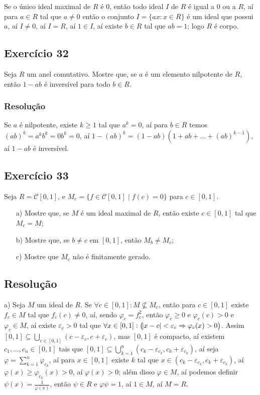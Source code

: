 \documentclass[10pt,a4paper]{article}
\begin{document}
\medskip
\noindent
Se o único ideal maximal de $R$ é $0$, então todo ideal $I$ de $R$ é igual a $0$ ou a $R$, aí para $a\in R$ tal que $a\neq 0$ então o conjunto $I=\{ax:x\in R\}$ é um ideal que possui $a$, aí $I\neq 0$, aí $I=R$, aí $1\in I$, aí existe $b\in R$ tal que $ab=1$; logo $R$ é corpo.

\subsection*{Exercício 32}
Seja $R$ um anel comutativo. Mostre que, se $a$ é um elemento nilpotente de $R$, então $1-ab$ é inversível para todo $b\in R$.

\subsubsection*{Resolução}

Se $a$ é nilpotente, existe $k\geq 1$ tal que $a^k=0$, aí para $b\in R$ temos $(ab)^k=a^kb^k=0b^k=0$, aí $1-(ab)^k=(1-ab)(1+ab+\dots+(ab)^{k-1})$, aí $1-ab$ é inversível.

\subsection*{Exercício 33}
Seja $R=\mathcal{C}[0,1]$, e $M_c=\{f\in\mathcal{C}[0,1]\mid f(c)=0\}$ para $c\in[0,1]$.
\begin{itemize}
\item[a)] Mostre que, se $M$ é um ideal maximal de $R$, então existe $c\in[0,1]$ tal que $M_c=M$;
\item[b)] Mostre que, se $b\neq c$ em $[0,1]$, então $M_b\neq M_c$;
\item[c)] Mostre que $M_c$ não é finitamente gerado.
\end{itemize}

\subsection*{Resolução}

a) Seja $M$ um ideal de $R$. Se $\forall c\in[0,1]:M\nsubseteq M_c$, então para $c\in[0,1]$ existe $f_c\in M$ tal que $f_c(c)\neq 0$, aí, sendo $\varphi_c=f_c^2$, então $\varphi_c\geq 0$ e $\varphi_c(c)>0$ e $\varphi_c\in M$, aí existe $\varepsilon_c>0$ tal que $\forall x\in[0,1]:\left(\abs{x-c}<\varepsilon_c\Rightarrow\varphi_c(x)>0\right)$. Assim $[0,1]\subseteq\bigcup_{c\in[0,1]}(c-\varepsilon_c,c+\varepsilon_c)$, mas $[0,1]$ é compacto, aí existem $c_1,\dots,c_n\in[0,1]$ tais que $[0,1]\subseteq\bigcup_{k=1}^n(c_k-\varepsilon_{c_k},c_k+\varepsilon_{c_k})$, aí seja $\varphi=\sum_{k=1}^n\varphi_{c_k}$, aí para $x\in[0,1]$ existe $k$ tal que $x\in(c_k-\varepsilon_{c_k},c_k+\varepsilon_{c_k})$, aí $\varphi(x)\geq\varphi_{c_k}(x)>0$, aí $\varphi(x)>0$; além disso $\varphi\in M$, aí podemos definir $\psi(x)=\frac{1}{\varphi(x)}$, então $\psi\in R$ e $\varphi\psi=1$, aí $1\in M$, aí $M=R$.
\end{document}
